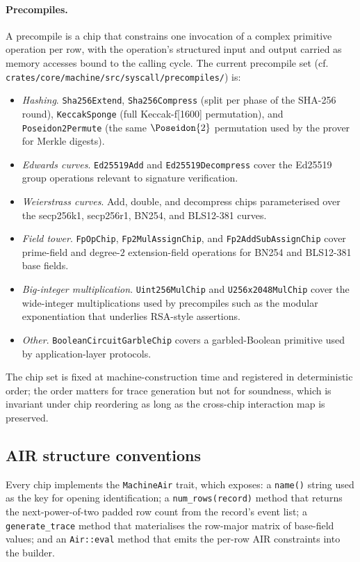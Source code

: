 \paragraph{Precompiles.} A precompile is a chip that constrains one invocation of a complex primitive operation per row, with the operation's structured input and output carried as memory accesses bound to the calling cycle. The current precompile set (cf. \texttt{crates/core/machine/src/syscall/precompiles/}) is:
\begin{itemize}
  \item \emph{Hashing}. \texttt{Sha256Extend}, \texttt{Sha256Compress} (split per phase of the SHA-256 round), \texttt{KeccakSponge} (full Keccak-f[1600] permutation), and \texttt{Poseidon2Permute} (the same $\Poseidon{2}$ permutation used by the prover for Merkle digests).
  \item \emph{Edwards curves}. \texttt{Ed25519Add} and \texttt{Ed25519Decompress} cover the Ed25519 group operations relevant to signature verification.
  \item \emph{Weierstrass curves}. Add, double, and decompress chips parameterised over the secp256k1, secp256r1, BN254, and BLS12-381 curves.
  \item \emph{Field tower}. \texttt{FpOpChip}, \texttt{Fp2MulAssignChip}, and \texttt{Fp2AddSubAssignChip} cover prime-field and degree-$2$ extension-field operations for BN254 and BLS12-381 base fields.
  \item \emph{Big-integer multiplication}. \texttt{Uint256MulChip} and \texttt{U256x2048MulChip} cover the wide-integer multiplications used by precompiles such as the modular exponentiation that underlies RSA-style assertions.
  \item \emph{Other}. \texttt{BooleanCircuitGarbleChip} covers a garbled-Boolean primitive used by application-layer protocols.
\end{itemize}

The chip set is fixed at machine-construction time and registered in deterministic order; the order matters for trace generation but not for soundness, which is invariant under chip reordering as long as the cross-chip interaction map is preserved.

\subsection{AIR structure conventions}

Every chip implements the \texttt{MachineAir} trait, which exposes:
a \texttt{name()} string used as the key for opening identification;
a \texttt{num\_rows(record)} method that returns the next-power-of-two padded row count from the record's event list;
a \texttt{generate\_trace} method that materialises the row-major matrix of base-field values; and
an \texttt{Air::eval} method that emits the per-row AIR constraints into the builder.

